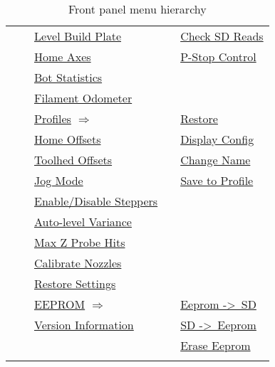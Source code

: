 {\begin{table}[!hb]
\begin{tabular}{lllll}
\hhline{~~|-|-|-|}
&& \cellcolor{LightBlue} \hyperref[sec:levelbp]{Level Build Plate} && \cellcolor{LightCyan} \hyperref[sec:sd-crc]{Check SD Reads} \\
\hhline{~~|-|~|-|}
&& \cellcolor{LightCyan} \hyperref[sec:home-axes]{Home Axes} && \cellcolor{LightCyan} \hyperref[sec:pstop-enable]{P-Stop Control} \\
\hhline{~~|-|~~}
&& \cellcolor{LightBlue} \hyperref[sec:bot-stats]{Bot Statistics} \\
\hhline{~~|-|~~}
&& \cellcolor{LightCyan} \hyperref[sec:filodo]{Filament Odometer} \\
\hhline{~~|-|-|-|}
&& \multicolumn{2}{l}{\cellcolor{LightBlue} \hyperref[sec:profiles]{Profiles} \hfil\phantom{nmmmmmmm} \hfil $\Longrightarrow$} & \cellcolor{LightBlue} \hyperref[sec:profiles-r]{Restore} \\
\hhline{~~|-|-|-|}
&& \cellcolor{LightCyan} \hyperref[sec:homeoff]{Home Offsets} && \cellcolor{LightBlue} \hyperref[sec:profiles-dc]{Display Config} \\
\hhline{~~|-|~|-|}
&& \cellcolor{LightBlue} \hyperref[sec:tooloff]{Toolhed Offsets} && \cellcolor{LightBlue} \hyperref[sec:profiles-cn]{Change Name} \\
\hhline{~~|-|~|-|}
&& \cellcolor{LightCyan} \hyperref[sec:jog]{Jog Mode} && \cellcolor{LightBlue} \hyperref[sec:profiles-sp]{Save to Profile} \\
\hhline{~~|-|~|-|}
&& \cellcolor{LightBlue} \hyperref[sec:steppers-enable]{Enable/Disable Steppers} \\
\hhline{~~|-|~~}
&& \cellcolor{LightCyan} \hyperref[sec:alevel-variance]{Auto-level Variance} \\
\hhline{~~|-|~~}
&& \cellcolor{LightBlue} \hyperref[sec:alevel-maxhits]{Max Z Probe Hits} \\
\hhline{~~|-|~~}
&& \cellcolor{LightCyan} \hyperref[sec:calibnozz]{Calibrate Nozzles} \\
\hhline{~~|-|~~}
&& \cellcolor{LightBlue} \hyperref[sec:restore-settings]{Restore Settings} \\
\hhline{~~|-|~|-|}
&&  \multicolumn{2}{l}{\cellcolor{LightCyan} \hyperref[sec:eeprom]{EEPROM} \hfil\phantom{nmmmmmm} \hfil $\Longrightarrow$} & \cellcolor{LightCyan} \hyperref[sec:eeprom]{Eeprom -\textgreater\ SD} \\
\hhline{~~|-|~|-|}
&& \cellcolor{LightBlue} \hyperref[sec:versinf]{Version Information} && \cellcolor{LightCyan} \hyperref[sec:eeprom]{SD -\textgreater\ Eeprom} \\
\hhline{~~~~|-|}
&&&& \cellcolor{LightCyan} \hyperref[sec:eeprom]{Erase Eeprom} \\
\hhline{~~~~|-|}
\end{tabular}
\caption[Front panel menu hierarchy]{Front panel menu hierarchy}
\label{tab:menu-tree}
\end{table}
}
\fi
\fi
